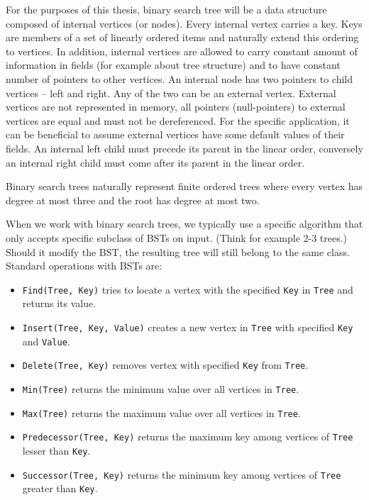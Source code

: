 For the purposes of this thesis, binary search tree will be a data structure composed of internal vertices (or nodes). Every internal vertex carries a key. Keys are members of a set of linearly ordered items and naturally extend this ordering to vertices. In addition, internal vertices are allowed to carry constant amount of information in fields (for example about tree structure) and to have constant number of pointers to other vertices. An internal node has two pointers to child vertices -- left and right. Any of the two can be an external vertex. External vertices are not represented in memory, all pointers (null-pointers) to external vertices are equal and must not be dereferenced. For the specific application, it can be beneficial to assume external vertices have some default values of their fields. An internal left child must precede its parent in the linear order, conversely an internal right child must come after its parent in the linear order.

Binary search trees naturally represent finite ordered trees where every vertex has degree at most three and the root has degree at most two.

When we work with binary search trees, we typically use a specific algorithm that only accepts specific subclass of BSTs on input. (Think for example 2-3 trees.) Should it modify the BST, the resulting tree will still belong to the same class. Standard operations with BSTs are:

\begin{itemize}
	\item \texttt{Find(Tree, Key)} tries to locate a vertex with the specified \texttt{Key} in \texttt{Tree} and returns its value. 
	\item \texttt{Insert(Tree, Key, Value)} creates a new vertex in \texttt{Tree} with specified \texttt{Key} and \texttt{Value}.
	\item \texttt{Delete(Tree, Key)} removes vertex with specified \texttt{Key} from \texttt{Tree}.
	\item \texttt{Min(Tree)} returns the minimum value over all vertices in \texttt{Tree}.
	\item \texttt{Max(Tree)} returns the maximum value over all vertices in \texttt{Tree}.
	\item \texttt{Predecessor(Tree, Key)} returns the maximum key among vertices of \texttt{Tree} lesser than \texttt{Key}.
	\item \texttt{Successor(Tree, Key)} returns the minimum key among vertices of \texttt{Tree} greater than \texttt{Key}.
\end{itemize}


